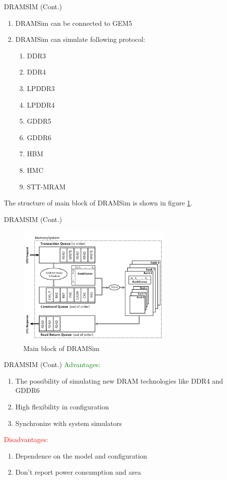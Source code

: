 \documentclass{beamer}
\begin{document}
\begin{frame}{DRAMSIM (Cont.)}
	\begin{enumerate}
		\item DRAMSim can be connected to GEM5
		\item DRAMSim can simulate following protocol:
		\begin{enumerate}
			\item DDR3
			\item DDR4
			\item ‫‪LPDDR3‬‬
			\item ‫‪LPDDR4‬‬
			\item ‫‪GDDR5‬‬
			\item ‫‪GDDR6‬‬
			\item HBM
			\item HMC
			\item ‫‪STT-MRAM‬‬
		\end{enumerate}
	\end{enumerate}
	
	The structure of main block of DRAMSim is shown in figure \ref{fig:Main block of DRAMSim}.
\end{frame}



\begin{frame}{DRAMSIM (Cont.)}
	\begin{figure}
		\centering
		\includegraphics[height=6cm]{images/img11}
		\caption{Main block of DRAMSim}
		\label{fig:Main block of DRAMSim}
	\end{figure}
\end{frame}




\begin{frame}{DRAMSIM (Cont.)}
	\textcolor{green}{Advantages:}
	\begin{enumerate}
		\item The possibility of simulating new DRAM technologies like DDR4 and GDDR6
		\item High flexibility in configuration
		\item Synchronize with system simulators
	\end{enumerate}
	
	\textcolor{red}{Disadvantages:}
	\begin{enumerate}
		\item Dependence on the model and configuration
		\item Don't report power consumption and area
	\end{enumerate}
\end{frame}
\end{document}
